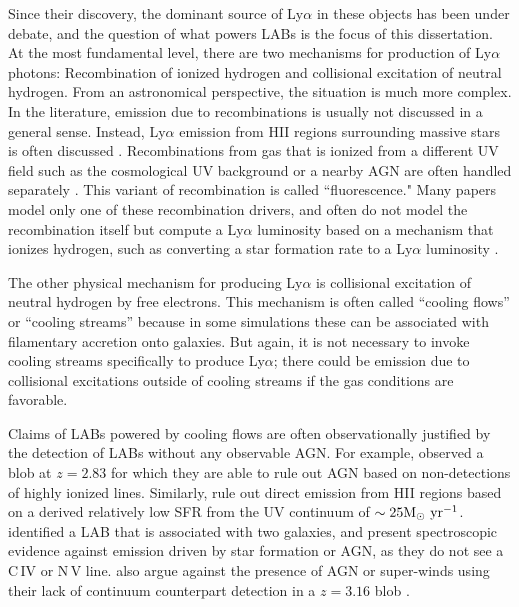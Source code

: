 Since their discovery, the dominant source of Ly$\alpha$ in these objects has been under debate, and the question of what powers LABs is the focus of this dissertation.
At the most fundamental level, there are two mechanisms for production of Ly$\alpha$ photons: Recombination of ionized hydrogen and collisional excitation of neutral hydrogen.
From an astronomical perspective, the situation is much more complex.
In the literature, emission due to recombinations is usually not discussed in a general sense.
Instead, Ly$\alpha$ emission from HII regions surrounding massive stars is often discussed \citep[e.g.][]{Geach2016}.
Recombinations from gas that is ionized from a different UV field such as the cosmological UV background or a nearby AGN are often handled separately \citep{Kollmeier2010,Gronke2017}.
This variant of recombination is called ``fluorescence."
Many papers model only one of these recombination drivers, and often do not model the recombination itself but compute a Ly$\alpha$ luminosity based on a mechanism that ionizes hydrogen, such as converting a star formation rate to a Ly$\alpha$ luminosity \citep[e.g.][]{Cen2013}.

The other physical mechanism for producing Ly$\alpha$ is collisional excitation of neutral hydrogen by free electrons.
This mechanism is often called ``cooling flows'' or ``cooling streams'' because in some simulations these can be associated with filamentary accretion onto galaxies.
But again, it is not necessary to invoke cooling streams specifically to produce Ly$\alpha$; there could be emission due to collisional excitations outside of cooling streams if the gas conditions are favorable.

Claims of LABs powered by cooling flows are often observationally justified by the detection of LABs without any observable AGN.
For example, \citet{Smith2007} observed a blob at $z=2.83$ for which they are able to rule out AGN based on non-detections of highly ionized lines.
Similarly, \citet{Smith2007} rule out direct emission from HII regions based on a derived relatively low SFR from the UV continuum of  $\sim 25 \rm{M}_{\odot}\ \rm{yr}^{-1}$.
 \citet{Scarlata2009} identified a LAB that is associated with two galaxies, and present spectroscopic evidence against emission driven by star formation or AGN, as they do not see a C\,\textsc{IV} or N\,\textsc{V} line.
\citet{Nilsson2006} also argue against the presence of AGN or super-winds using their lack of continuum counterpart detection in a $z=3.16$ blob \citep[though this is debated, see e.g.][]{Prescott2015}.

